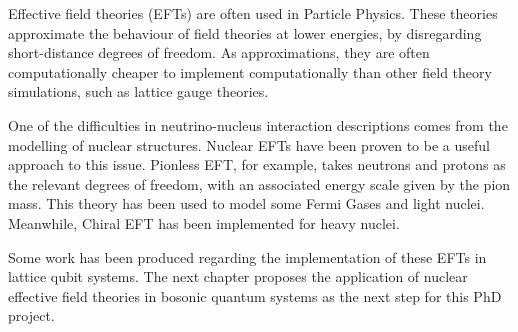 Effective field theories (EFTs) are often used in Particle Physics. These theories approximate the behaviour of field theories at lower energies, by disregarding short-distance degrees of freedom. As approximations, they are often computationally cheaper to implement computationally than other field theory simulations, such as lattice gauge theories.

One of the difficulties in neutrino-nucleus interaction descriptions comes from the modelling of nuclear structures. Nuclear EFTs have been proven to be a useful approach to this issue. Pionless EFT, for example, takes neutrons and protons as the relevant degrees of freedom, with an associated energy scale given by the pion mass. This theory has been used to model some Fermi Gases and light nuclei\cite{Bansal2017}. Meanwhile, Chiral EFT has been implemented for heavy nuclei. 

Some work has been produced regarding the implementation of these EFTs in lattice qubit systems. The next chapter proposes the application of nuclear effective field theories in bosonic quantum systems as the next step for this PhD project.


\clearpage

